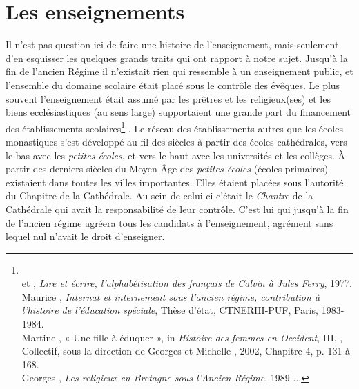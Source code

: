  

\section{Les enseignements}

    
   Il n'est pas question ici de faire une histoire de l'enseignement, mais seulement d'en esquisser les quelques grands traits qui ont rapport à notre sujet. Jusqu'à la fin de l'ancien Régime il n'existait rien qui ressemble à un enseignement public, et l'ensemble du domaine scolaire était placé sous le contrôle des évêques. Le plus souvent l'enseignement était assumé par les prêtres et les religieux(ses) et les biens ecclésiastiques (au sens large) supportaient une grande part du financement des établissements scolaires\footnote{\\ et , \emph{Lire et écrire, l'alphabétisation des français de Calvin à Jules Ferry}, 1977.
\\Maurice {}, \emph{Internat et internement sous l'ancien régime, contribution à l'histoire de l'éducation spéciale}, Thèse d'état, CTNERHI-PUF, Paris, 1983-1984.
\\Martine {}, {« Une fille à éduquer », in \emph{Histoire des femmes en Occident}, III, }, Collectif, sous la direction de Georges  et Michelle , 2002, Chapitre 4, p. 131 à 168.
\\Georges {}, \emph{Les religieux en Bretagne sous l'Ancien Régime}, 1989 ...}%
. Le réseau des établissements autres que les écoles monastiques s'est développé au fil des siècles à partir des écoles cathédrales, vers le bas avec les \emph{petites écoles}, et vers le haut avec les universités et les collèges. À partir des derniers siècles du Moyen Âge des \emph{petites écoles} (écoles primaires) existaient dans toutes les villes importantes. Elles étaient placées sous l'autorité du Chapitre de la Cathédrale. Au sein de celui-ci c'était le \emph{Chantre} de la Cathédrale qui avait la responsabilité de leur contrôle. C'est lui qui jusqu'à la fin de l'ancien régime agréera tous les candidats à l'enseignement, agrément sans lequel nul n'avait le droit d'enseigner. 


